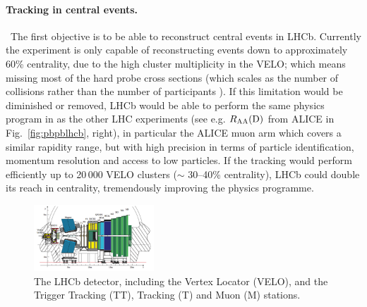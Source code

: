 \documentclass[a4paper,11pt]{article}
\newcommand{\ER}{ER\xspace}
\begin{document}
\paragraph{Tracking in central \pbpb events. }\ 
The first objective is to be able to reconstruct central events in LHCb. Currently the experiment is only capable of reconstructing \pbpb events down to approximately 60\% centrality, due to the high cluster multiplicity in the VELO; which means missing most of the hard probe cross sections (which scales as the number of collisions \ncoll rather than the number of participants \npart). 
If this limitation would be diminished or removed, LHCb would be able to perform the same physics program in \pbpb as the other LHC experiments (see e.g. $R_{\text{AA}}(\text{D})$ from ALICE in Fig.~\ref{fig:pbpblhcb}, right), in particular the ALICE muon arm which covers a similar rapidity range, but with high precision in terms of particle identification, momentum resolution and access to low \pt particles. If the tracking would perform efficiently up to 20\,000 VELO clusters ($\sim$ 30--40\% centrality), LHCb could double its reach in centrality, tremendously improving the \pbpb physics programme.


\begin{figure}
\vspace{-10pt}
  \begin{center}
    \includegraphics[width=0.4\textwidth]{plots/lhcblayout.png}
  \end{center}
  \caption{The LHCb detector, including the Vertex Locator (VELO), and the Trigger Tracking (TT), Tracking (T) and Muon (M) stations. \label{fig:lhcb}}
  \vspace{-10pt}
\end{figure}
\end{document}
